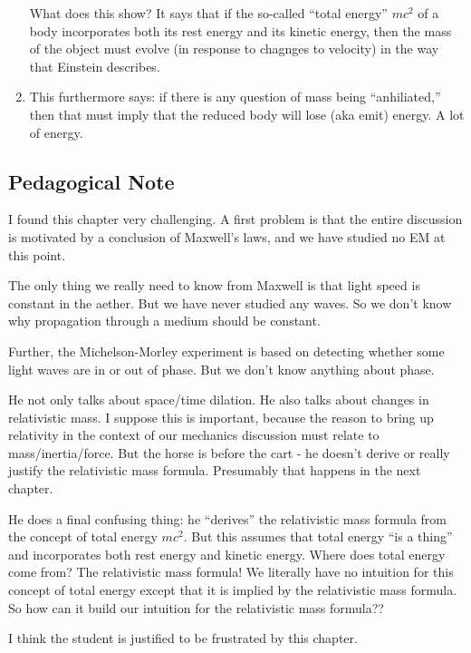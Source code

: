 \begin{enumerate}
  What does this show? It says that if the so-called ``total energy''
  $mc^2$ of a body incorporates both its rest energy and its kinetic
  energy, then the mass of the object must evolve (in response to
  chagnges to velocity) in the way that Einstein describes.

  \item This furthermore says: if there is any question of mass being
  ``anhiliated,'' then that must imply that the reduced body will lose
  (aka emit) energy. A lot of energy.

\end{enumerate}

\subsection{Pedagogical Note}

I found this chapter very challenging. A first problem is that the
entire discussion is motivated by a conclusion of Maxwell's laws, and we
have studied no EM at this point.

The only thing we really need to know from Maxwell is that light speed
is constant in the aether. But we have never studied any waves. So we
don't know why propagation through a medium should be constant.

Further, the Michelson-Morley experiment is based on detecting whether
some light waves are in or out of phase. But we don't know anything
about phase.

He not only talks about space/time dilation. He also talks about changes
in relativistic mass. I suppose this is important, because the reason to
bring up relativity in the context of our mechanics discussion must
relate to mass/inertia/force. But the horse is before the cart - he
doesn't derive or really justify the relativistic mass formula.
Presumably that happens in the next chapter.

He does a final confusing thing: he ``derives'' the relativistic mass
formula from the concept of total energy $mc^2$. But this assumes that
total energy ``is a thing'' and incorporates both rest energy and
kinetic energy. Where does total energy come from? The relativistic mass
formula! We literally have no intuition for this concept of total energy
except that it is implied by the relativistic mass formula. So how can
it build our intuition for the relativistic mass formula??

I think the student is justified to be frustrated by this chapter.
